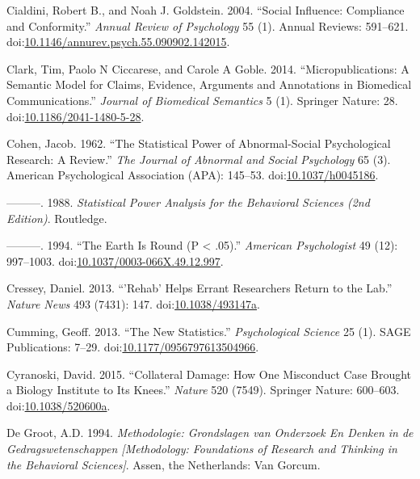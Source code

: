 \documentclass[a5paper]{book}
\begin{document}
\hypertarget{ref-doi:10.1146ux2fannurev.psych.55.090902.142015}{}
Cialdini, Robert B., and Noah J. Goldstein. 2004. ``Social Influence:
Compliance and Conformity.'' \emph{Annual Review of Psychology} 55 (1).
Annual Reviews: 591--621.
doi:\href{https://doi.org/10.1146/annurev.psych.55.090902.142015}{10.1146/annurev.psych.55.090902.142015}.

\hypertarget{ref-doi:10.1186ux2f2041-1480-5-28}{}
Clark, Tim, Paolo N Ciccarese, and Carole A Goble. 2014.
``Micropublications: A Semantic Model for Claims, Evidence, Arguments
and Annotations in Biomedical Communications.'' \emph{Journal of
Biomedical Semantics} 5 (1). Springer Nature: 28.
doi:\href{https://doi.org/10.1186/2041-1480-5-28}{10.1186/2041-1480-5-28}.

\hypertarget{ref-doi:10.1037ux2fh0045186}{}
Cohen, Jacob. 1962. ``The Statistical Power of Abnormal-Social
Psychological Research: A Review.'' \emph{The Journal of Abnormal and
Social Psychology} 65 (3). American Psychological Association (APA):
145--53. doi:\href{https://doi.org/10.1037/h0045186}{10.1037/h0045186}.

\hypertarget{ref-isbn:9780805802832}{}
---------. 1988. \emph{Statistical Power Analysis for the Behavioral
Sciences (2nd Edition)}. Routledge.

\hypertarget{ref-doi:10.1037ux2f0003-066X.49.12.997}{}
---------. 1994. ``The Earth Is Round (P \textless{} .05).''
\emph{American Psychologist} 49 (12): 997--1003.
doi:\href{https://doi.org/10.1037/0003-066X.49.12.997}{10.1037/0003-066X.49.12.997}.

\hypertarget{ref-doi:10.1038ux2f493147a}{}
Cressey, Daniel. 2013. ``'Rehab' Helps Errant Researchers Return to the
Lab.'' \emph{Nature News} 493 (7431): 147.
doi:\href{https://doi.org/10.1038/493147a}{10.1038/493147a}.

\hypertarget{ref-doi:10.1177ux2f0956797613504966}{}
Cumming, Geoff. 2013. ``The New Statistics.'' \emph{Psychological
Science} 25 (1). SAGE Publications: 7--29.
doi:\href{https://doi.org/10.1177/0956797613504966}{10.1177/0956797613504966}.

\hypertarget{ref-doi:10.1038ux2f520600a}{}
Cyranoski, David. 2015. ``Collateral Damage: How One Misconduct Case
Brought a Biology Institute to Its Knees.'' \emph{Nature} 520 (7549).
Springer Nature: 600--603.
doi:\href{https://doi.org/10.1038/520600a}{10.1038/520600a}.

\hypertarget{ref-isbn:9789023228912}{}
De Groot, A.D. 1994. \emph{Methodologie: Grondslagen van Onderzoek En
Denken in de Gedragswetenschappen {[}Methodology: Foundations of
Research and Thinking in the Behavioral Sciences{]}}. Assen, the
Netherlands: Van Gorcum.
\end{document}

